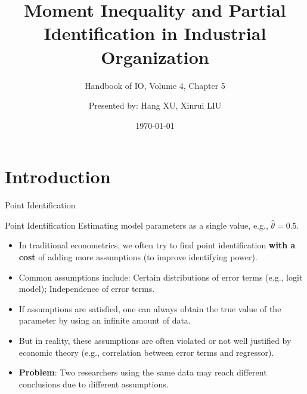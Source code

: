 \documentclass[aspectratio=169]{beamer}  %
\title{Moment Inequality and Partial Identification in Industrial Organization}
\subtitle{Handbook of IO, Volume 4, Chapter 5}
\author{Presented by: Hang XU, Xinrui LIU}
\institute{Hong Kong University of Science and Technology}
\date{\today}
\begin{document}
\begin{frame}
    \titlepage
\end{frame}





\section{Introduction}
\begin{frame}{Point Identification}
    \begin{block}{Point Identification}
        Estimating model parameters as a single value, e.g., $\hat{\theta} = 0.5$.
    \end{block}
    \pause
    \begin{itemize}
        \item In traditional econometrics, we often try to find point identification \textbf{with a cost} of adding more assumptions (to improve identifying power).
        \item Common assumptions include: Certain distributions of error terms (e.g., logit model); Independence of error terms.
        \item If assumptions are satisfied, one can always obtain the true value of the parameter by using an infinite amount of data.
        \item But in reality, these assumptions are often violated or not well justified by economic theory (e.g., correlation between error terms and regressor).
        \item \textbf{Problem}: Two researchers using the same data may reach different conclusions due to different assumptions.
    \end{itemize}
\end{frame}
\end{document}
